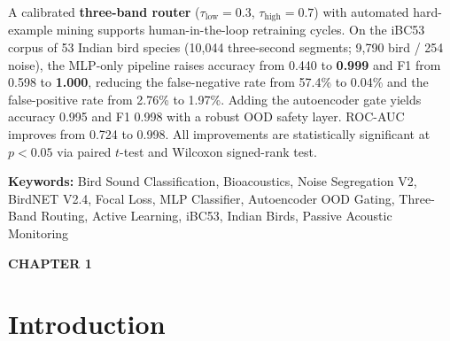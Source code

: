 \documentclass[a4paper,12pt]{article}
\begin{document}
\vspace{0.3cm}

\noindent
A calibrated \textbf{three-band router} ($\tau_{\mathrm{low}} = 0.3$, $\tau_{\mathrm{high}} = 0.7$)
with automated hard-example mining supports human-in-the-loop retraining cycles. On the iBC53 corpus
of 53 Indian bird species (10,044 three-second segments; 9,790 bird / 254 noise), the MLP-only
pipeline raises accuracy from 0.440 to \textbf{0.999} and F1 from 0.598 to \textbf{1.000}, reducing
the false-negative rate from 57.4\% to 0.04\% and the false-positive rate from 2.76\% to 1.97\%.
Adding the autoencoder gate yields accuracy 0.995 and F1 0.998 with a robust OOD safety layer.
ROC-AUC improves from 0.724 to 0.998. All improvements are statistically significant at $p < 0.05$
via paired $t$-test and Wilcoxon signed-rank test.

\vspace{0.5cm}

\noindent
\textbf{Keywords:} Bird Sound Classification, Bioacoustics, Noise Segregation V2, BirdNET V2.4,
Focal Loss, MLP Classifier, Autoencoder OOD Gating, Three-Band Routing, Active Learning,
iBC53, Indian Birds, Passive Acoustic Monitoring

\newpage
\tableofcontents

\newpage
\listoffigures

\newpage
\listoftables

\newpage
{}
\setcounter{page}{1}

\newpage
\thispagestyle{plain}

\begin{center}
{\fontsize{18}{20}\bfseries CHAPTER 1}
\end{center}

\vspace{0.5cm}

\setcounter{section}{0}
\renewcommand{\thesection}{1.\arabic{section}}

\section{Introduction}
\end{document}
